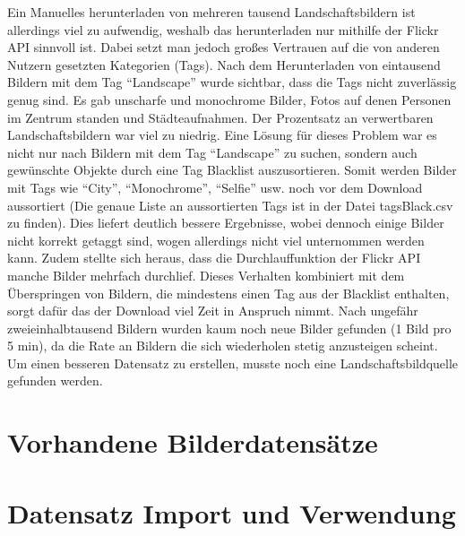 Ein Manuelles herunterladen von mehreren tausend Landschaftsbildern ist allerdings viel zu aufwendig, weshalb das herunterladen nur mithilfe der Flickr API sinnvoll ist. Dabei setzt man jedoch großes Vertrauen auf die von anderen Nutzern gesetzten Kategorien (Tags). Nach dem Herunterladen von eintausend Bildern mit dem Tag \enquote{Landscape} wurde sichtbar, dass die Tags nicht zuverlässig genug sind. Es gab unscharfe und monochrome Bilder, Fotos auf denen Personen im Zentrum standen und Städteaufnahmen. Der Prozentsatz an verwertbaren Landschaftsbildern war viel zu niedrig. Eine Lösung für dieses Problem war es nicht nur nach Bildern mit dem Tag  \enquote{Landscape} zu suchen, sondern auch gewünschte Objekte durch eine Tag Blacklist auszusortieren. Somit werden Bilder mit Tags wie \enquote{City}, \enquote{Monochrome}, \enquote{Selfie} usw. noch vor dem Download aussortiert (Die genaue Liste an aussortierten Tags ist in der Datei tagsBlack.csv zu finden). Dies liefert deutlich bessere Ergebnisse, wobei dennoch einige Bilder nicht korrekt getaggt sind, wogen allerdings nicht viel unternommen werden kann. Zudem stellte sich heraus, dass die Durchlauffunktion der Flickr API manche Bilder mehrfach durchlief. Dieses Verhalten kombiniert mit dem Überspringen von Bildern, die mindestens einen Tag aus der Blacklist enthalten, sorgt dafür das der Download viel Zeit in Anspruch nimmt. Nach ungefähr zweieinhalbtausend Bildern wurden kaum noch neue Bilder gefunden (1 Bild pro 5 min), da die Rate an Bildern die sich wiederholen stetig anzusteigen scheint. Um einen besseren Datensatz zu erstellen, musste noch eine Landschaftsbildquelle gefunden werden.

\section{Vorhandene Bilderdatensätze}%

\section{Datensatz Import und Verwendung}%